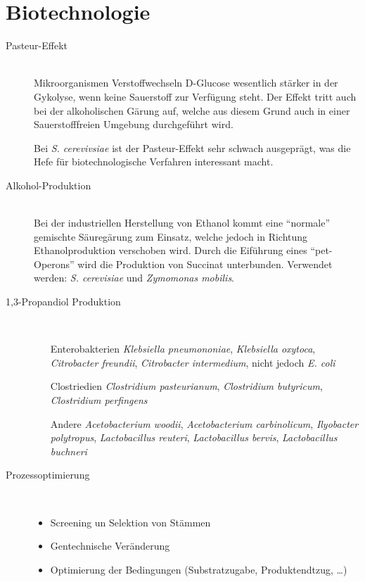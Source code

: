 \section{Biotechnologie}

\begin{description}
	\item[Pasteur-Effekt] \hfill \\
		Mikroorganismen Verstoffwechseln D-Glucose wesentlich stärker in der Gykolyse,
		wenn keine Sauerstoff zur Verfügung steht.
		Der Effekt tritt auch bei der alkoholischen Gärung auf,
		welche aus diesem Grund auch in einer Sauerstofffreien Umgebung durchgeführt wird.

		Bei \emph{S. cerevivsiae} ist der Pasteur-Effekt sehr schwach ausgeprägt,
		was die Hefe für biotechnologische Verfahren interessant macht.

	\item[Alkohol-Produktion] \hfill \\
		Bei der industriellen Herstellung von Ethanol kommt eine ``normale'' gemischte Säuregärung zum Einsatz,
		welche jedoch in Richtung Ethanolproduktion verschoben wird.
		Durch die Eiführung eines ``pet-Operons'' wird die Produktion von Succinat unterbunden.
		Verwendet werden: \emph{S. cerevisiae} und \emph{Zymomonas mobilis}.

	\item[1,3-Propandiol Produktion] \hfill \\
		\begin{itemize}
			\item[Enterobakterien] 
				\emph{Klebsiella pneumononiae},
				\emph{Klebsiella oxytoca},
				\emph{Citrobacter freundii},
				\emph{Citrobacter intermedium}, 
				nicht jedoch \emph{E. coli}
			\item[Clostriedien] 
				\emph{Clostridium pasteurianum},
				\emph{Clostridium butyricum},
				\emph{Clostridium perfingens}
			\item[Andere]
				\emph{Acetobacterium woodii},
				\emph{Acetobacterium carbinolicum},
				\emph{Ilyobacter polytropus},
				\emph{Lactobacillus reuteri},
				\emph{Lactobacillus bervis},
				\emph{Lactobacillus buchneri}
		\end{itemize}

	\item[Prozessoptimierung] \hfill \\
		\begin{itemize}
			\item Screening un Selektion von Stämmen
			\item Gentechnische Veränderung
			\item Optimierung der Bedingungen (Substratzugabe, Produktendtzug, \ldots)
		\end{itemize}


\end{description}

